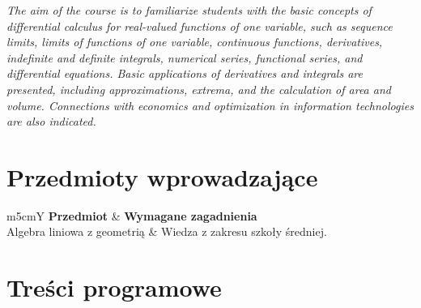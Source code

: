 \documentclass[12pt, a4paper]{article}
\newcommand{\thdrule}{\noalign{\global\setlength{\extrarowheight}{0pt}}}
\newcommand{\thdend}{\noalign{\global\setlength{\extrarowheight}{3pt}}}
\begin{document}
\textit{The aim of the course is to familiarize students with the basic concepts of differential calculus for real-valued functions of one variable, such as sequence limits, limits of functions of one variable, continuous functions, derivatives, indefinite and definite integrals, numerical series, functional series, and differential equations. Basic applications of derivatives and integrals are presented, including approximations, extrema, and the calculation of area and volume. Connections with economics and optimization in information technologies are also indicated.}


\section{Przedmioty wprowadzające}

{\scriptsize
\begin{tabularx}{\textwidth}{m{5cm}Y}
\thdrule\toprule
{} {\color{white}\textbf{Przedmiot}} & {\color{white}\textbf{Wymagane zagadnienia}} \\
\midrule\thdend
   Algebra liniowa z geometrią & Wiedza z zakresu szkoły średniej. \\
\bottomrule
\end{tabularx}}

\section{Treści programowe}
\end{document}
